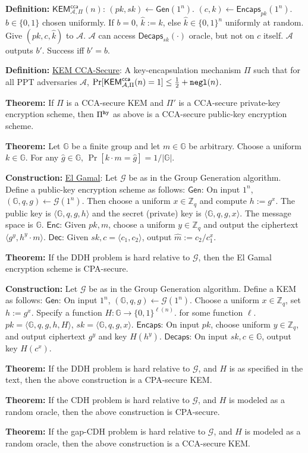 \documentclass[10pt]{article}
\newcommand{\Z}{\mathbb{Z}}
\newcommand{\G}{\mathbb{G}}
\newcommand{\AAA}{\mathcal{A}}
\newcommand{\GGG}{\mathcal{G}}
\newcommand{\defn}[1]{{\bf Definition:} \underline{#1}}
\newcommand{\thm}[1]{{\bf Theorem:} \underline{#1}}
\newcommand{\con}[1]{{\bf Construction:} \underline{#1}}
\newcommand{\Enc}{\mathsf{Enc}}
\newcommand{\Dec}{\mathsf{Dec}}
\newcommand{\Encaps}{\mathsf{Encaps}}
\newcommand{\Decaps}{\mathsf{Decaps}}
\newcommand{\Gen}{\mathsf{Gen}}
\newcommand{\ang}[1]{\langle#1\rangle}
\newcommand{\ExptKemCca}{\mathsf{KEM}^{\mathsf{cca}}_{\AAA,\Pi}}
\newcommand{\negl}{{\tt negl}}
\newcommand{\hy}{{\tt hy}}
\newcommand{\from}{\leftarrow}
\begin{document}
\begin{multicols}{3}
\defn{$\ExptKemCca(n)$}: $(pk,sk)\from\Gen(1^n)$. $(c,k)\from\Encaps_{pk}(1^n)$. $b\in\{0,1\}$ chosen uniformly. If $b=0$, $\hat{k}:=k$, else $\hat{k}\in\{0,1\}^n$ uniformly at random. Give $(pk,c,\hat{k})$ to $\AAA$. $\AAA$ can access $\Decaps_{sk}(\cdot)$ oracle, but not on $c$ itself. $\AAA$ outputs $b'$. Success iff $b'=b$.

\defn{KEM CCA-Secure}: A key-encapsulation mechanism $\Pi$ such that for all PPT adversaries $\AAA$, $\Pr[\ExptKemCca(n)=1]\leq\frac{1}{2}+\negl(n)$.

\thm{}If $\Pi$ is a CCA-secure KEM and $\Pi'$ is a CCA-secure private-key encryption scheme, then $\Pi^\hy$ as above is a CCA-secure public-key encryption scheme.

\thm{}Let $\G$ be a finite group and let $m\in\G$ be arbitrary. Choose a uniform $k\in\G$. For any $\hat{g}\in\G$, $\Pr[k\cdot m=\hat{g}]=1/|\G|$.

\con{El Gamal}: Let $\GGG$ be as in the Group Generation algorithm. Define a public-key encryption scheme as follows: $\Gen$: On input $1^n$, $(\G,q,g)\from\GGG(1^n)$. Then choose a uniform $x\in\Z_q$ and compute $h:=g^x$. The public key is $\ang{\G,q,g,h}$ and the secret (private) key is $\ang{\G,q,g,x}$. The message space is $\G$. $\Enc$: Given $pk,m$, choose a uniform $y\in\Z_q$ and output the ciphertext $\ang{g^y,h^y\cdot m}$. $\Dec$: Given $sk,c=\ang{c_1,c_2}$, output $\hat{m}:=c_2/c_1^x$.

\thm{}If the DDH problem is hard relative to $\GGG$, then the El Gamal encryption scheme is CPA-secure.

\con{}Let $\GGG$ be as in the Group Generation algorithm. Define a KEM as follows: $\Gen$: On input $1^n$, $(\G,q,g)\from\GGG(1^n)$. Choose a uniform $x\in\Z_q$, set $h:=g^x$. Specify a function $H:\G\to\{0,1\}^{\ell(n)}$. for some function $\ell$. $pk=\ang{\G,q,g,h,H}$, $sk=\ang{\G,q,g,x}$. $\Encaps$: On input $pk$, choose uniform $y\in\Z_q$, and output ciphertext $g^y$ and key $H(h^y)$. $\Decaps$: On input $sk,c\in\G$, output key $H(c^x)$.

\thm{}If the DDH problem is hard relative to $\GGG$, and $H$ is as specified in the text, then the above construction is a CPA-secure KEM.

\thm{}If the CDH problem is hard relative to $\GGG$, and $H$ is modeled as a random oracle, then the above construction is CPA-secure.

\thm{}If the gap-CDH problem is hard relative to $\GGG$, and $H$ is modeled as a random oracle, then the above construction is a CCA-secure KEM.


\end{multicols}
\end{document}
